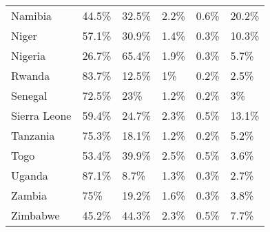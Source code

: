 \begin{table}[ht]
\begin{tabular}{llllll}
  Namibia & 44.5\% & 32.5\% & 2.2\% & 0.6\% & 20.2\% \\ 
  Niger & 57.1\% & 30.9\% & 1.4\% & 0.3\% & 10.3\% \\ 
  Nigeria & 26.7\% & 65.4\% & 1.9\% & 0.3\% & 5.7\% \\ 
  Rwanda & 83.7\% & 12.5\% & 1\% & 0.2\% & 2.5\% \\ 
  Senegal & 72.5\% & 23\% & 1.2\% & 0.2\% & 3\% \\ 
  Sierra Leone & 59.4\% & 24.7\% & 2.3\% & 0.5\% & 13.1\% \\ 
  Tanzania & 75.3\% & 18.1\% & 1.2\% & 0.2\% & 5.2\% \\ 
  Togo & 53.4\% & 39.9\% & 2.5\% & 0.5\% & 3.6\% \\ 
  Uganda & 87.1\% & 8.7\% & 1.3\% & 0.3\% & 2.7\% \\ 
  Zambia & 75\% & 19.2\% & 1.6\% & 0.3\% & 3.8\% \\ 
  Zimbabwe & 45.2\% & 44.3\% & 2.3\% & 0.5\% & 7.7\% \\ 
   \hline
\end{tabular}
\end{table}
